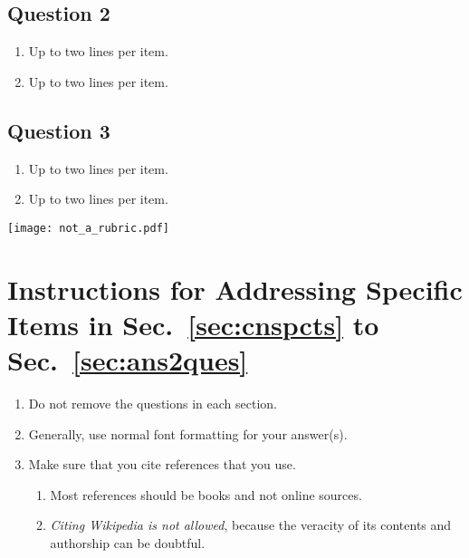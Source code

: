 \subsection{Question 2}  
\begin{enumerate}
\item Up to two lines per item.
\item Up to two lines per item.
\end{enumerate}
	
\subsection{Question 3}  
\begin{enumerate}
\item Up to two lines per item.
\item Up to two lines per item.
\end{enumerate}	







\newpage
\begin{figure*}[!t]
	\texttt{[image: not\_a\_rubric.pdf]} %
\end{figure*}
\cleardoublepage























\appendices

\section{Instructions for Addressing Specific Items in Sec.~\ref{sec:cnspcts} to Sec.~\ref{sec:ans2ques}}

\begin{enumerate}

	\item Do not remove the questions in each section.
	
	\item Generally, use normal font formatting for your answer(s).

	\item Make sure that you cite references that you use. 
		
	\begin{enumerate}
		\item  Most references should be books and not online sources. 
		
		\item \emph{Citing Wikipedia is not allowed}, because the veracity of its contents and authorship can be doubtful.
	\end{enumerate}
	
\end{enumerate}





